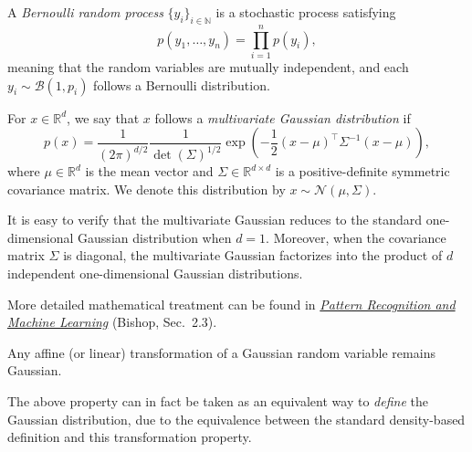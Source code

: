 \documentclass[../main]{subfiles}
\begin{document}
\begin{definition}
    A \emph{Bernoulli random process} $\{y_i\}_{i\in\mathbb{N}}$ is a stochastic process satisfying
    \begin{equation}
        p(y_1,\dots,y_n)
        = \prod_{i=1}^n p(y_i),
    \end{equation}
    meaning that the random variables are mutually independent, and each
$
        y_i \sim \mathcal{B}(1, p_i)
$
    follows a Bernoulli distribution.
\end{definition}
\begin{definition}
    For $x\in\mathbb{R}^d$, we say that $x$ follows a \emph{multivariate Gaussian distribution} if
    \begin{equation}
        p(x)
        = \frac{1}{(2\pi)^{d/2}}
          \frac{1}{\det(\Sigma)^{1/2}}
          \exp\!\left(
              -\frac{1}{2}(x-\mu)^\top \Sigma^{-1} (x-\mu)
          \right),
    \end{equation}
    where $\mu\in\mathbb{R}^d$ is the mean vector and $\Sigma\in\mathbb{R}^{d\times d}$ is a positive-definite symmetric covariance matrix.
    We denote this distribution by
    $
        x \sim \mathcal{N}(\mu, \Sigma).
$
\end{definition}

It is easy to verify that the multivariate Gaussian reduces to the standard one-dimensional
Gaussian distribution when $d=1$.
Moreover, when the covariance matrix $\Sigma$ is diagonal, the multivariate Gaussian
factorizes into the product of $d$ independent one-dimensional Gaussian distributions.

\begin{remark}
    More detailed mathematical treatment can be found in
    \href{https://www.microsoft.com/en-us/research/wp-content/uploads/2006/01/Bishop-Pattern-Recognition-and-Machine-Learning-2006.pdf}{\emph{Pattern Recognition and Machine Learning}} (Bishop, Sec.~2.3).
\end{remark}

    
    \begin{theorem}
        Any affine (or linear) transformation of a Gaussian random variable
        remains Gaussian.
    \end{theorem}
    
    The above property can in fact be taken as an equivalent way to
    \emph{define} the Gaussian distribution, due to the equivalence between the
    standard density-based definition and this transformation property.
    
\end{document}
